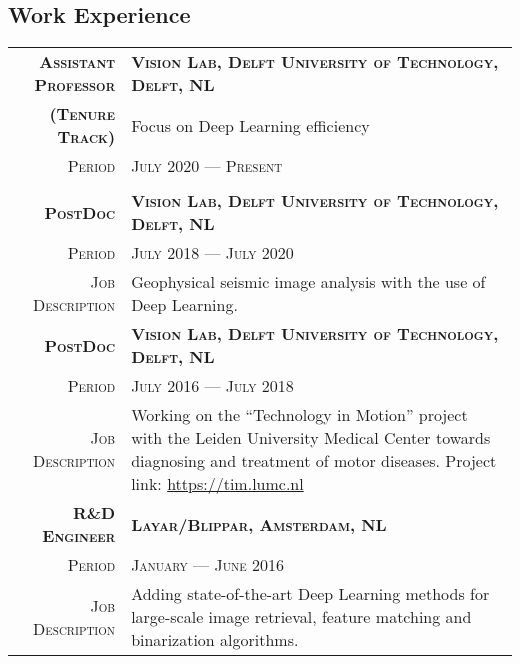 \documentclass[a4paper, oneside, final]{scrartcl}
\newcommand{\gray}{\rowcolor[gray]{.90}}
\begin{document}
\begin{center}
		\section{Work Experience}
		\begin{tabular}{r@{\hskip 0.3in}p{13.3cm}}
			\gray \textsc{\textbf{Assistant Professor}} & \textsc{\textbf{Vision Lab, Delft University of Technology, Delft, NL}}\\
			\gray \textsc{\textbf{(Tenure Track)}} & Focus on Deep Learning efficiency\\
			\textsc{Period}                     & \textsc{July 2020 --- Present} \\
            \vspace{5px}\\
			\gray \textsc{\textbf{PostDoc}}     & \textsc{\textbf{Vision Lab, Delft University of Technology, Delft, NL}}\\
			\textsc{Period}                     & \textsc{July 2018 --- July 2020} \\
			\textsc{Job Description}            & Geophysical seismic image analysis with the use of Deep Learning. 
            \vspace{5px}\\
			\gray \textsc{\textbf{PostDoc}}     & \textsc{\textbf{Vision Lab, Delft University of Technology, Delft, NL}}\\
			\textsc{Period}                     & \textsc{July 2016 --- July 2018} \\
			\textsc{Job Description}            & Working on the ``Technology in Motion'' project with the Leiden University Medical Center 
				towards diagnosing and treatment of motor diseases.
				Project link: \href{https://tim.lumc.nl}{https://tim.lumc.nl}
            \vspace{5px}\\
			\gray \textsc{\textbf{R\&D Engineer}}   & \textsc{\textbf{Layar\slash Blippar, Amsterdam, NL}}\\
			\textsc{Period}                         & \textsc{January --- June 2016} \\
			\textsc{Job Description}                &  Adding state-of-the-art Deep Learning methods for large-scale image retrieval, 
				feature matching and binarization algorithms.\\
		\end{tabular}


\end{center}
\end{document}
